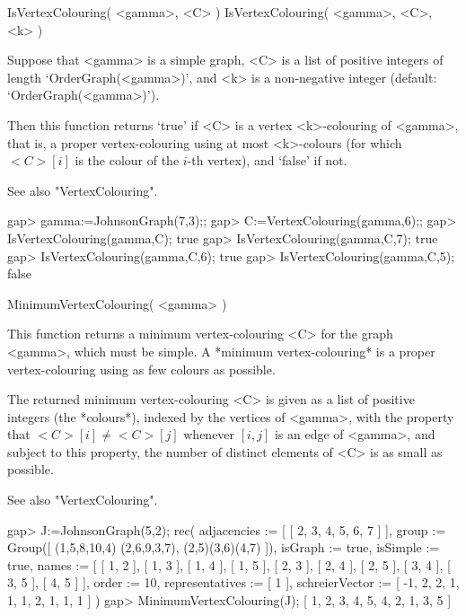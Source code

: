 
\>IsVertexColouring( <gamma>, <C> )
\>IsVertexColouring( <gamma>, <C>, <k> )

Suppose that <gamma> is a simple graph, <C> is a list of positive integers
of length `OrderGraph(<gamma>)', and <k> is a non-negative integer
(default: `OrderGraph(<gamma>)').

Then this function returns `true' if <C> is a vertex <k>-colouring of
<gamma>, that is, a proper vertex-colouring using at most <k>-colours (for
which $<C>[i]$ is the colour of the $i$-th vertex), and `false' if not.

See also "VertexColouring".

\beginexample
gap> gamma:=JohnsonGraph(7,3);;
gap> C:=VertexColouring(gamma,6);;
gap> IsVertexColouring(gamma,C);
true
gap> IsVertexColouring(gamma,C,7);
true
gap> IsVertexColouring(gamma,C,6);
true
gap> IsVertexColouring(gamma,C,5);
false
\endexample


\>MinimumVertexColouring( <gamma> )

This function returns a minimum vertex-colouring <C> for the graph
<gamma>, which must be simple. A *minimum vertex-colouring*
is a proper vertex-colouring using as few colours as possible.

The returned minimum vertex-colouring <C> is given as a list of positive
integers (the *colours*), indexed by the vertices of <gamma>, with the
property that $<C>[i]\not=<C>[j]$ whenever $[i,j]$ is an edge of <gamma>,
and subject to this property, the number of distinct elements of <C>
is as small as possible.

See also "VertexColouring".

\beginexample
gap> J:=JohnsonGraph(5,2);
rec( adjacencies := [ [ 2, 3, 4, 5, 6, 7 ] ], group := Group([ (1,5,8,10,4)
  (2,6,9,3,7), (2,5)(3,6)(4,7) ]), isGraph := true, isSimple := true, 
  names := [ [ 1, 2 ], [ 1, 3 ], [ 1, 4 ], [ 1, 5 ], [ 2, 3 ], [ 2, 4 ], 
      [ 2, 5 ], [ 3, 4 ], [ 3, 5 ], [ 4, 5 ] ], order := 10, 
  representatives := [ 1 ], schreierVector := [ -1, 2, 2, 1, 1, 1, 2, 1, 1, 1 
     ] )
gap> MinimumVertexColouring(J);
[ 1, 2, 3, 4, 5, 4, 2, 1, 3, 5 ]
\endexample



